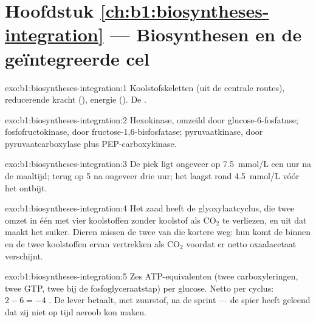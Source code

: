 \section*{Hoofdstuk \ref{ch:b1:biosyntheses-integration} --- Biosynthesen en de geïntegreerde cel}

\begin{solution}{exo:b1:biosyntheses-integration:1}
Koolstofskeletten (uit de centrale routes), reducerende kracht (), energie
(). De .
\end{solution}

\begin{solution}{exo:b1:biosyntheses-integration:2}
Hexokinase, omzeild door glucose-6-fosfatase; fosfofructokinase, door
fructose-1,6-bisfosfatase; pyruvaatkinase, door pyruvaatcarboxylase plus
PEP-carboxykinase.
\end{solution}

\begin{solution}{exo:b1:biosyntheses-integration:3}
De piek ligt ongeveer op \qty{7.5}{mmol/L} een uur na de maaltijd; terug op
\qty{5}{} na ongeveer drie uur; het laagst rond \qty{4.5}{mmol/L} vóór het ontbijt.
\end{solution}

\begin{solution}{exo:b1:biosyntheses-integration:4}
Het zaad heeft de glyoxylaatcyclus, die twee  omzet in één  met vier
koolstoffen zonder koolstof als $\mathrm{CO_2}$ te verliezen, en uit dat  maakt
het suiker. Dieren missen de twee  van die kortere weg: hun  komt
de  binnen en de twee koolstoffen ervan vertrekken als $\mathrm{CO_2}$
voordat er netto oxaalacetaat verschijnt.
\end{solution}

\begin{solution}{exo:b1:biosyntheses-integration:5}
Zes ATP-equivalenten (twee carboxyleringen, twee GTP, twee  bij de
fosfoglyceraatstap) per glucose. Netto per cyclus: $2 - 6 = -4$ . De lever
betaalt, met zuurstof, na de sprint --- de spier heeft  geleend dat zij niet op
tijd aeroob kon maken.
\end{solution}

